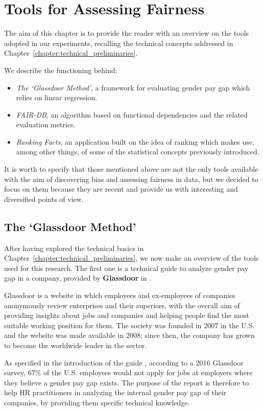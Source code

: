 \chapter{Tools for Assessing Fairness}
\label{chapter:tools_for_assessing_fairness}
\thispagestyle{empty}

The aim of this chapter is to provide the reader with an overview on the tools adopted in our experiments, recalling the technical concepts addressed in Chapter~\ref{chapter:technical_preliminaries}.

We describe the functioning behind:
\begin{itemize}
\item \textit{The `Glassdoor Method'}, a framework for evaluating gender pay gap which relies on linear regression.
\item \textit{FAIR-DB}, an algorithm based on functional dependencies and the related evaluation metrics.
\item \textit{Ranking Facts}, an application built on the idea of ranking which makes use, among other things, of some of the statistical concepts previously introduced.
\end{itemize}
It is worth to specify that those mentioned above are not the only tools available with the aim of discovering bias and assessing fairness in data, but we decided to focus on them because they are recent and provide us with interesting and diversified points of view.


\section{The `Glassdoor Method'}
\label{section:the_glassdoor_method}
After having explored the technical basics in Chapter~\ref{chapter:technical_preliminaries}, we now make an overview of the tools used for this research. The first one is a technical guide to analyze gender pay gap in a company, provided by \textbf{Glassdoor} in \cite{chamberlain2017analyze}.

Glassdoor is a website in which employees and ex-employees of companies anonymously review enterprises and their superiors, with the overall aim of providing insights about jobs and companies and helping people find the most suitable working position for them. The society was founded in 2007 in the U.S. and the website was made available in 2008; since then, the company has grown to become the worldwide leader in the sector.

As specified in the introduction of the guide \cite[p.~2]{chamberlain2017analyze}, according to a 2016 Glassdoor survey, 67\% of the U.S. employees would not apply for jobs at employers where they believe a gender pay gap exists. The purpose of the report is therefore to help HR practitioners in analyzing the internal gender pay gap of their companies, by providing them specific technical knowledge.

